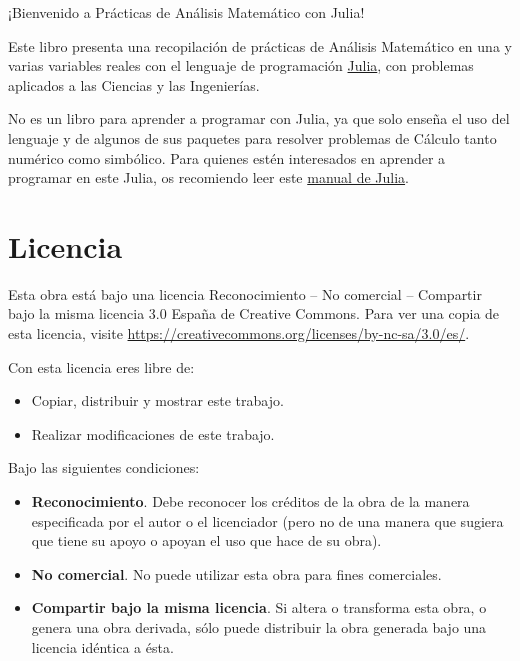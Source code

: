 \documentclass[
  a4paper,
]{scrreport}
\providecommand{\tightlist}{%
  \setlength{\itemsep}{0pt}\setlength{\parskip}{0pt}}\usepackage{longtable,booktabs,array}
\theoremstyle{definition}
\theoremstyle{remark}
\begin{document}

¡Bienvenido a Prácticas de Análisis Matemático con Julia!

Este libro presenta una recopilación de prácticas de Análisis Matemático
en una y varias variables reales con el lenguaje de programación
\href{https://julialang.org/}{Julia}, con problemas aplicados a las
Ciencias y las Ingenierías.

No es un libro para aprender a programar con Julia, ya que solo enseña
el uso del lenguaje y de algunos de sus paquetes para resolver problemas
de Cálculo tanto numérico como simbólico. Para quienes estén interesados
en aprender a programar en este Julia, os recomiendo leer este
\href{https://aprendeconalf.es/manual-julia/}{manual de Julia}.

\hypertarget{licencia}{%
\section*{Licencia}\label{licencia}}


Esta obra está bajo una licencia Reconocimiento -- No comercial --
Compartir bajo la misma licencia 3.0 España de Creative Commons. Para
ver una copia de esta licencia, visite
\url{https://creativecommons.org/licenses/by-nc-sa/3.0/es/}.

Con esta licencia eres libre de:

\begin{itemize}
\tightlist
\item
  Copiar, distribuir y mostrar este trabajo.
\item
  Realizar modificaciones de este trabajo.
\end{itemize}

Bajo las siguientes condiciones:

\begin{itemize}
\item
  \textbf{Reconocimiento}. Debe reconocer los créditos de la obra de la
  manera especificada por el autor o el licenciador (pero no de una
  manera que sugiera que tiene su apoyo o apoyan el uso que hace de su
  obra).
\item
  \textbf{No comercial}. No puede utilizar esta obra para fines
  comerciales.
\item
  \textbf{Compartir bajo la misma licencia}. Si altera o transforma esta
  obra, o genera una obra derivada, sólo puede distribuir la obra
  generada bajo una licencia idéntica a ésta.
\end{itemize}
\end{document}
